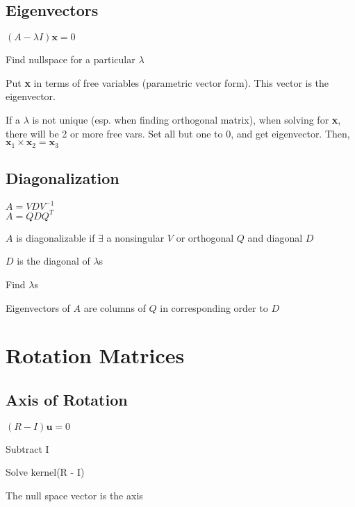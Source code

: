 \documentclass[10pt,letterpaper]{article}
\newenvironment{tight_item}
{\begin{itemize}
\setlength{\parskip}{0pt}
\setlength{\parsep}{0pt}
\setlength{\itemsep}{0pt}
\setlength{\parsep}{0pt}
\setlength{\topsep}{0pt}
\setlength{\partopsep}{0pt}
\setlength{\leftmargin}{0em}
\setlength{\labelwidth}{0em}
\setlength{\labelsep}{0em} }
{\end{itemize}}
\newenvironment{tight_enum}
{\begin{enumerate}
\setlength{\parskip}{0pt}
\setlength{\parsep}{0pt}
\setlength{\itemsep}{0pt}
\setlength{\parsep}{0pt}
\setlength{\topsep}{0pt}
\setlength{\partopsep}{0pt}
\setlength{\leftmargin}{0em}
\setlength{\labelwidth}{0em}
\setlength{\labelsep}{0em} }
{\end{enumerate}}
\begin{document}
{\begin{multicols*}{5}
\subsection{Eigenvectors}
\begin{center}
$(A- \lambda I)\textbf{x} = 0$
\end{center}
\begin{tight_enum}
\item Find nullspace for a particular $\lambda$
\item Put \textbf{x} in terms of free variables (parametric vector form). This
vector is the eigenvector.
\item If a $\lambda$ is not unique (esp. when finding orthogonal matrix), when
solving for \textbf{x}, there will be 2 or more free vars. Set all but one to 0,
and get eigenvector. Then, $\textbf{x}_{1} \times \textbf{x}_{2} =
\textbf{x}_{3}$
\end{tight_enum}

\subsection{Diagonalization}
\begin{center}
$A = VDV^{-1}$\\
$A = QDQ^{T}$
\end{center}
\begin{tight_item}
\item $A$ is diagonalizable if $\exists$ a nonsingular $V$ or orthogonal $Q$ and diagonal $D$
\item $D$ is the diagonal of $\lambda$s
\end{tight_item}
\begin{tight_enum}
\item Find $\lambda$s
\item Eigenvectors of $A$ are columns of $Q$ in corresponding order to $D$
\end{tight_enum}

\section{Rotation Matrices}

\subsection{Axis of Rotation}
\begin{center}
$(R - I) \textbf{u} = 0$
\end{center}
\begin{tight_enum}
\item Subtract I
\item Solve kernel(R - I)
\item The null space vector is the axis
\end{tight_enum}


\end{multicols*}}
\end{document}
